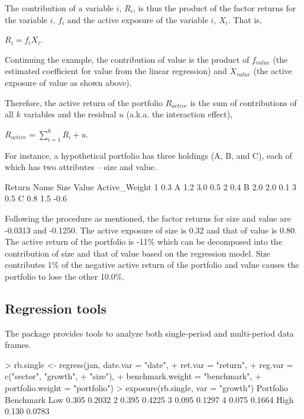 The contribution of a variable $i$, $R_i$, is thus the product of the
factor returns for the variable $i$, $f_i$ and the active exposure of
the variable $i$, $X_i$. That is,
\begin{center}
  $R_i = f_iX_i$.
\end{center}
Continuing the example, the contribution of value is the product of
$f_{value}$ (the estimated coefficient for value from the linear
regression) and $X_{value}$ (the active exposure of value as shown
above).

Therefore, the active return of the portfolio $R_{active}$ is the sum
of contributions of all $k$ variables and the residual $u$
(a.k.a. the interaction effect),
\begin{center}
  $R_{active} = \sum\limits_{i = 1}^kR_i + u$.
\end{center}

For instance, a hypothetical portfolio has three holdings (A, B, and
C), each of which has two attributes -- size and value.

\begin{smallverbatim}
  Return Name Size Value Active_Weight
1    0.3    A  1.2   3.0           0.5
2    0.4    B  2.0   2.0           0.1
3    0.5    C  0.8   1.5          -0.6
\end{smallverbatim}

Following the procedure as mentioned, the factor returns for size and
value are -0.0313 and -0.1250. The active exposure of size is 0.32
and that of value is 0.80. The active return of the portfolio is -11\%
which can be decomposed into the contribution of size and that of
value based on the regression model. Size contributes 1\% of the
negative active return of the portfolio and value causes the portfolio
to lose the other 10.0\%.
\subsection{Regression tools}

The  package provides tools to analyze
both single-period and multi-period data frames.
\begin{smallverbatim}
> rb.single <- regress(jan, date.var = "date",
+          ret.var = "return",
+          reg.var = c("sector", "growth", 
+                      "size"),
+          benchmark.weight = "benchmark",
+          portfolio.weight = "portfolio")
> exposure(rb.single, var = "growth")
     Portfolio Benchmark
Low      0.305    0.2032
2        0.395    0.4225
3        0.095    0.1297
4        0.075    0.1664
High     0.130    0.0783
\end{smallverbatim}

